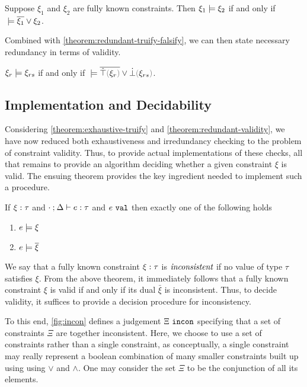 \begin{lemma}
	\label{lemma:material-entailment}
	Suppose $\xi_1$ and $\xi_2$ are fully known constraints. Then $\xi_1 \models \xi_2$ if and only if $\; \models \overline{\xi_1} \vee \xi_2$.
\end{lemma}

Combined with \autoref{theorem:redundant-truify-falsify}, we can then state necessary redundancy in terms of validity.

\begin{theorem}
	\label{theorem:redundant-validity}
	$\xi_r \models \xi_{rs}$ if and only if $\ccsatisfy{\;}{\cor{\cdual{\ctruify{\xi_r}}}{\cfalsify{\xi_{rs}}}}$.
\end{theorem}

\subsection{Implementation and Decidability}\label{sec:decidability}
Considering \autoref{theorem:exhaustive-truify} and \autoref{theorem:redundant-validity}, we have now reduced both exhaustiveness and irredundancy checking to the problem of constraint validity. Thus, to provide actual implementations of these checks, all that remains to provide an algorithm deciding whether a given constraint $\xi$ is valid. The ensuing theorem provides the key ingredient needed to implement such a procedure.

\begin{theorem}
	\label{theorem:exclusive-complete-constraint-satisfaction}
	If $\xi : \tau$ and $\cdot \mathbin{;} \Delta \vdash e : \tau$ and $e ~\mathtt{val}$ then exactly one of the following holds
	\begin{enumerate}
		\item $e \models \xi$
		\item $e \models \overline{\xi}$
	\end{enumerate}
\end{theorem}

We say that a fully known constraint $\xi : \tau$ is $\emph{inconsistent}$ if no value of type $\tau$ satisfies $\xi$. From the above theorem, it immediately follows that a fully known constraint $\xi$ is valid if and only if its dual $\bar{\xi}$ is inconsistent. Thus, to decide validity, it suffices to provide a decision procedure for inconsistency. 

To this end, \autoref{fig:incon} defines a judgement  $\Xi ~\mathtt{incon}$ specifying that a set of constraints $\Xi$ are together inconsistent. Here, we choose to use a set of constraints rather than a single constraint, as conceptually, a single constraint may really represent a boolean combination of many smaller constraints built up using using $\lor$ and $\land$. One may consider the set $\Xi$ to be the conjunction of all its elements.

